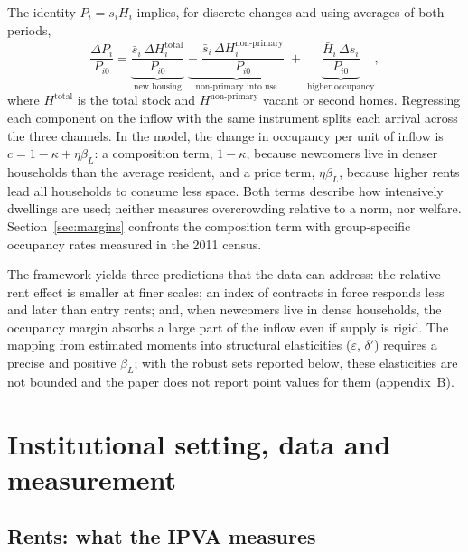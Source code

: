\documentclass[11pt,a4paper]{article}
\begin{document}
The identity $P_i=s_iH_i$ implies, for discrete changes and using averages of both periods,
\begin{equation}\label{eq:identity}
\frac{\Delta P_i}{P_{i0}}=\underbrace{\frac{\bar s_i\,\Delta H_i^{\text{total}}}{P_{i0}}}_{\text{new housing}}\;\underbrace{-\;\frac{\bar s_i\,\Delta H_i^{\text{non-primary}}}{P_{i0}}}_{\text{non-primary into use}}\;+\;\underbrace{\frac{\bar H_i\,\Delta s_i}{P_{i0}}}_{\text{higher occupancy}},
\end{equation}
where $H^{\text{total}}$ is the total stock and $H^{\text{non-primary}}$ vacant or second homes. Regressing each component on the inflow with the same instrument splits each arrival across the three channels. In the model, the change in occupancy per unit of inflow is $c=1-\kappa+\eta\beta_L$: a composition term, $1-\kappa$, because newcomers live in denser households than the average resident, and a price term, $\eta\beta_L$, because higher rents lead all households to consume less space. Both terms describe how intensively dwellings are used; neither measures overcrowding relative to a norm, nor welfare. Section~\ref{sec:margins} confronts the composition term with group-specific occupancy rates measured in the 2011 census.

The framework yields three predictions that the data can address: the relative rent effect is smaller at finer scales; an index of contracts in force responds less and later than entry rents; and, when newcomers live in dense households, the occupancy margin absorbs a large part of the inflow even if supply is rigid. The mapping from estimated moments into structural elasticities ($\varepsilon$, $\delta'$) requires a precise and positive $\beta_L$; with the robust sets reported below, these elasticities are not bounded and the paper does not report point values for them (appendix~B).

\section{Institutional setting, data and measurement}\label{sec:data}

\subsection{Rents: what the IPVA measures}
\end{document}
